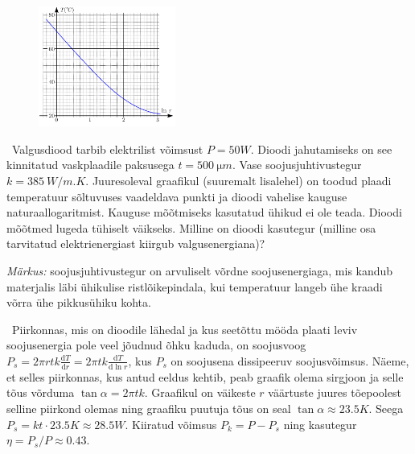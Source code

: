 
\begin{figure}
	\vspace{-20pt}
	\begin{center}
		\includegraphics[width = 0.4\textwidth]{2018-lahg-09-yl.pdf}
	\end{center}
\end{figure}

\
Valgusdiood tarbib elektrilist võimsust $P=\SI{50}W$. Dioodi jahutamiseks on see kinnitatud vaskplaadile paksusega $t=\SI{500}{\micro m}$. Vase soojusjuhtivustegur $k=\SI{385}{W/m.K}$. Juuresoleval graafikul (suuremalt lisalehel) on toodud plaadi temperatuur sõltuvuses vaadeldava punkti ja dioodi vahelise kauguse naturaallogaritmist. Kauguse mõõtmiseks kasutatud ühikud ei ole teada. Dioodi mõõtmed lugeda tühiselt väikseks. Milline on dioodi kasutegur (milline osa tarvitatud elektrienergiast kiirgub valgusenergiana)?

\textit{Märkus:} soojusjuhtivustegur on arvuliselt võrdne soojusenergiaga, mis kandub materjalis läbi ühikulise ristlõikepindala, kui temperatuur langeb ühe kraadi võrra ühe pikkusühiku kohta.




\hint

\solu
\
Piirkonnas, mis on dioodile lähedal ja kus seetõttu mööda plaati leviv soojusenergia pole veel jõudnud õhku kaduda, on soojusvoog $P_s=2\pi rtk \frac{\mathrm d T}{\mathrm d r}=2\pi tk \frac{\mathrm d T}{\mathrm d \ln r}$, kus $P_s$ on soojusena dissipeeruv soojusvõimsus. Näeme, et selles piirkonnas, kus antud eeldus kehtib, peab graafik olema sirgjoon ja selle tõus võrduma $\tan\alpha=2\pi tk$. Graafikul on väikeste $r$ väärtuste juures tõepoolest selline piirkond olemas ning graafiku puutuja tõus on seal $\tan\alpha\approx\SI{23.5}K$. Seega $P_s=kt\cdot \SI{23.5}K\approx \SI{28.5}W$. Kiiratud võimsus $P_k=P-P_s$ ning kasutegur $\eta=P_s/P\approx 0.43$.
\probend